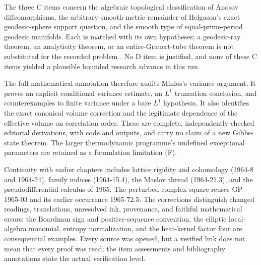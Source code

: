 The three C items concern the algebraic topological classification of Anosov diffeomorphisms, the arbitrary-smooth-metric remainder of Helgason’s exact geodesic-sphere support question, and the smooth type of equal-prime-period geodesic manifolds. Each is matched with its own hypotheses; a geodesic-ray theorem, an analyticity theorem, or an entire-Grauert-tube theorem is not substituted for the recorded problem \citep[Conjecture 2.3]{spatzier2016rigidity}\citep[Problem 4.1]{quinto2008helgason}\citep[Main Theorem]{lisong2026zoll}. No D item is justified, and none of these C items yielded a plausible bounded research advance in this run.

The full mathematical annotation therefore audits Minlos’s variance argument. It proves an explicit conditional variance estimate, an \(L^1\) truncation conclusion, and counterexamples to finite variance under a bare \(L^1\) hypothesis. It also identifies the exact canonical volume correction and the legitimate dependence of the effective volume on correlation order. These are complete, independently checked editorial derivations, with code and outputs, and carry no claim of a new Gibbs-state theorem. The larger thermodynamic programme’s undefined exceptional parameters are retained as a formulation limitation (F).

Continuity with earlier chapters includes lattice rigidity and cohomology (1964-8 and 1964-24), family indices (1964-15.4), the Maslov thread (1964-21.3), and the pseudodifferential calculus of 1965. The perturbed complex square reuses GP-1965-03 and its earlier occurrence 1965-72.5. The corrections distinguish changed readings, translations, unresolved ink, provenance, and faithful mathematical errors: the Boardman sign and positive-sequence convention, the elliptic local-algebra monomial, entropy normalization, and the heat-kernel factor four are consequential examples. Every source was opened, but a verified link does not mean that every proof was read; the item assessments and bibliography annotations state the actual verification level.
